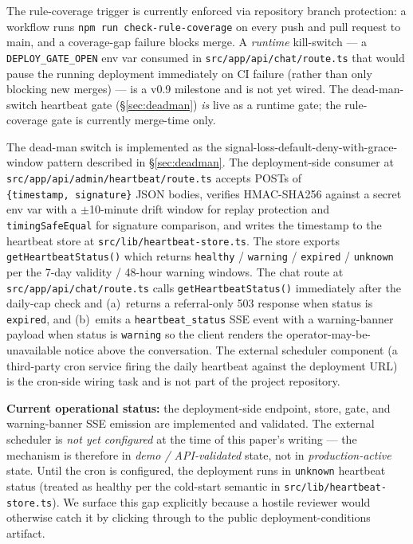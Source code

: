 \documentclass[letterpaper]{article} %
\begin{document}
The rule-coverage trigger is currently enforced via repository branch protection: a workflow runs \texttt{npm run check-rule-coverage} on every push and pull request to main, and a coverage-gap failure blocks merge. A \emph{runtime} kill-switch --- a \texttt{DEPLOY\_GATE\_OPEN} env var consumed in \texttt{src/app/api/chat/route.ts} that would pause the running deployment immediately on CI failure (rather than only blocking new merges) --- is a v0.9 milestone and is not yet wired. The dead-man-switch heartbeat gate (\S\ref{sec:deadman}) \emph{is} live as a runtime gate; the rule-coverage gate is currently merge-time only.

The dead-man switch is implemented as the signal-loss-default-deny-with-grace-window pattern described in \S\ref{sec:deadman}. The deployment-side consumer at \texttt{src/app/api/admin/heartbeat/route.ts} accepts POSTs of \texttt{\{timestamp,~signature\}} JSON bodies, verifies HMAC-SHA256 against a secret env var with a $\pm$10-minute drift window for replay protection and \texttt{timingSafeEqual} for signature comparison, and writes the timestamp to the heartbeat store at \texttt{src/lib/heartbeat-store.ts}. The store exports \texttt{getHeartbeatStatus()} which returns \texttt{healthy} / \texttt{warning} / \texttt{expired} / \texttt{unknown} per the 7-day validity / 48-hour warning windows. The chat route at \texttt{src/app/api/chat/route.ts} calls \texttt{getHeartbeatStatus()} immediately after the daily-cap check and (a)~returns a referral-only 503 response when status is \texttt{expired}, and (b)~emits a \texttt{heartbeat\_status} SSE event with a warning-banner payload when status is \texttt{warning} so the client renders the operator-may-be-unavailable notice above the conversation. The external scheduler component (a third-party cron service firing the daily heartbeat against the deployment URL) is the cron-side wiring task and is not part of the project repository.

\noindent\textbf{Current operational status:} the deployment-side endpoint, store, gate, and warning-banner SSE emission are implemented and validated. The external scheduler is \emph{not yet configured} at the time of this paper's writing --- the mechanism is therefore in \emph{demo / API-validated} state, not in \emph{production-active} state. Until the cron is configured, the deployment runs in \texttt{unknown} heartbeat status (treated as healthy per the cold-start semantic in \texttt{src/lib/heartbeat-store.ts}). We surface this gap explicitly because a hostile reviewer would otherwise catch it by clicking through to the public deployment-conditions artifact.
\end{document}
